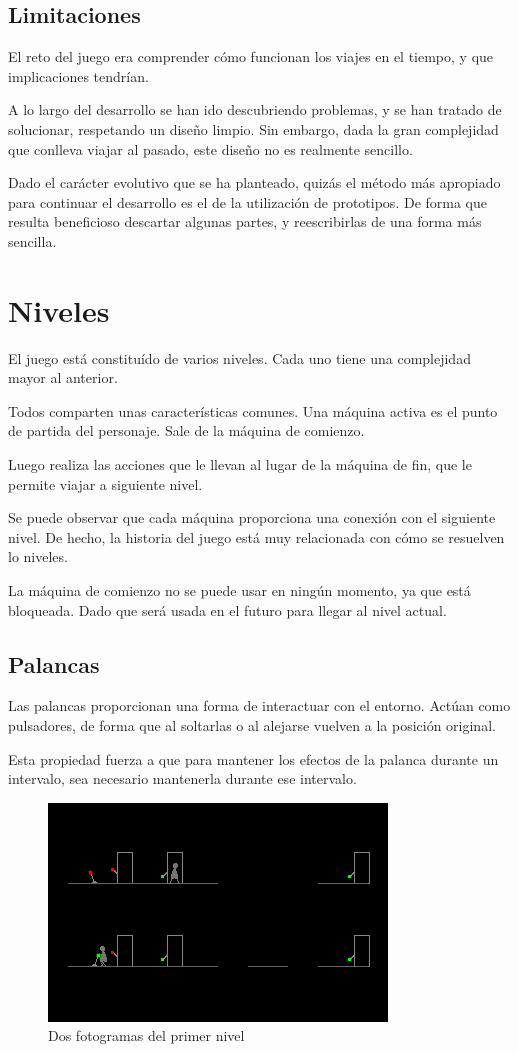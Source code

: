 \documentclass[11pt,a4paper]{article}
\begin{document}
\subsection{Limitaciones}
El reto del juego era comprender cómo funcionan los viajes en el tiempo, y que 
implicaciones tendrían.

A lo largo del desarrollo se han ido descubriendo problemas, y se han tratado de 
solucionar, respetando un diseño limpio. Sin embargo, dada la gran complejidad 
que conlleva viajar al pasado, este diseño no es realmente sencillo.

Dado el carácter evolutivo que se ha planteado, quizás el método más apropiado 
para continuar el desarrollo es el de la utilización de prototipos. De forma que 
resulta beneficioso descartar algunas partes, y reescribirlas de una forma más 
sencilla.

\section{Niveles}

El juego está constituído de varios niveles. Cada uno tiene una complejidad 
mayor al anterior.

Todos comparten unas características comunes. Una máquina activa es el punto de 
partida del personaje. Sale de la máquina de comienzo.

Luego realiza las acciones que le llevan al lugar de la máquina de fin, que le 
permite viajar a siguiente nivel.

Se puede observar que cada máquina proporciona una conexión con el siguiente 
nivel. De hecho, la historia del juego está muy relacionada con cómo se 
resuelven lo niveles.

La máquina de comienzo no se puede usar en ningún momento, ya que está 
bloqueada. Dado que será usada en el futuro para llegar al nivel actual.

\subsection{Palancas}
Las palancas proporcionan una forma de interactuar con el entorno. Actúan como 
pulsadores, de forma que al soltarlas o al alejarse vuelven a la posición 
original.

Esta propiedad fuerza a que para mantener los efectos de la palanca durante un 
intervalo, sea necesario mantenerla durante ese intervalo.


\begin{figure}[h]
\centering
\includegraphics[scale=0.8]{level1.png}
\caption{Dos fotogramas del primer nivel}
\label{}
\end{figure}
\end{document}
